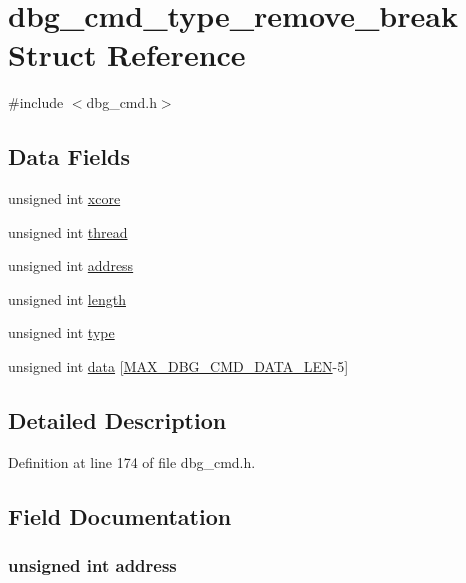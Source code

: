 \hypertarget{structdbg__cmd__type__remove__break}{\section{dbg\-\_\-cmd\-\_\-type\-\_\-remove\-\_\-break Struct Reference}
\label{structdbg__cmd__type__remove__break}
}


{\ttfamily \#include $<$dbg\-\_\-cmd.\-h$>$}

\subsection*{Data Fields}
\begin{DoxyCompactItemize}
\item 
unsigned int \hyperlink{structdbg__cmd__type__remove__break_a78357326dd562d441c3c73f5676ac638}{xcore}
\item 
unsigned int \hyperlink{structdbg__cmd__type__remove__break_a13f572e7828e1694c6f9c9c78bf7d8f5}{thread}
\item 
unsigned int \hyperlink{structdbg__cmd__type__remove__break_a2f55ff1f6cd45ca1b6431493ab5614eb}{address}
\item 
unsigned int \hyperlink{structdbg__cmd__type__remove__break_ac8d42bcd4a44e078047ccd7291059238}{length}
\item 
unsigned int \hyperlink{structdbg__cmd__type__remove__break_a4bfea42429249a1f65204f0c0f34704a}{type}
\item 
unsigned int \hyperlink{structdbg__cmd__type__remove__break_ab91dff01c2f12e354ddb4becbe93f063}{data} \mbox{[}\hyperlink{dbg__cmd_8h_a4552ec15033c8a68870cdf80eda5470c}{M\-A\-X\-\_\-\-D\-B\-G\-\_\-\-C\-M\-D\-\_\-\-D\-A\-T\-A\-\_\-\-L\-E\-N}-\/5\mbox{]}
\end{DoxyCompactItemize}


\subsection{Detailed Description}


Definition at line 174 of file dbg\-\_\-cmd.\-h.



\subsection{Field Documentation}
\hypertarget{structdbg__cmd__type__remove__break_a2f55ff1f6cd45ca1b6431493ab5614eb}{
\subsubsection[{address}]{\setlength{\rightskip}{0pt plus 5cm}unsigned int address}}\label{structdbg__cmd__type__remove__break_a2f55ff1f6cd45ca1b6431493ab5614eb}


